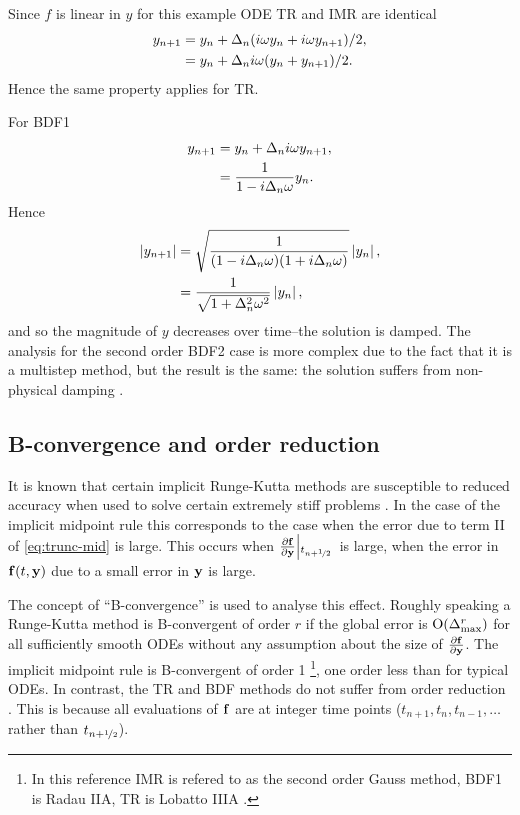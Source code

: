Since $f$ is linear in $y$ for this example ODE TR and IMR are identical
\begin{equation}
  \begin{aligned}
    y_{n+1} &= y_n + \Delta_{n}(i\omega y_n + i\omega y_{n+1})/2, \\
    &= y_n + \Delta_{n} i \omega (y_n + y_{n+1})/2.
  \end{aligned} 
\end{equation}
Hence the same property applies for TR.

For BDF1
\begin{equation}
  \begin{aligned}
    y_{n+1} &= y_n + \Delta_{n} i \omega y_{n+1}, \\
    &= \frac{1}{1 - i \Delta_{n} \omega} y_n.
  \end{aligned}
\end{equation}
Hence
\begin{equation}
  \begin{aligned}
    \left|{y_{n+1}} \right| &= \sqrt{ \frac{1}{(1 - i \Delta_{n} \omega)(1 + i \Delta_{n} \omega)}} \left|{y_n} \right|, \\
    &= \frac{1}{\sqrt{1 + \Delta_{n}^2 \omega^2}} \left|{y_n} \right|, \\
  \end{aligned}
\end{equation}
and so the magnitude of $y$ decreases over time--the solution is damped.
The analysis for the second order BDF2 case is more complex due to the fact that it is a multistep method, but the result is the same: the solution suffers from non-physical damping \cite[265]{GreshoSani}.


\subsection{B-convergence and order reduction}
\label{sec:order-reduction}

It is known that certain implicit Runge-Kutta methods are susceptible to reduced accuracy when used to solve certain extremely stiff problems \cite[156]{Atkinson1994}\cite[225]{HairerWanner}.
In the case of the implicit midpoint rule this corresponds to the case when the error due to term II of \eqref{eq:trunc-mid} is large. This occurs when $\frac{\partial {\mathbf{f}}}{\partial \mathbf{y}}{\left|_{t_{n+\nicefrac{1}{2}}{}}\right.}$ is large, \ie when the error in ${\mathbf{f}{\left( t, \mathbf{y} \right)}}$ due to a small error in $\mathbf{y}$ is large.

The concept of ``B-convergence'' is used to analyse this effect.
Roughly speaking a Runge-Kutta method is B-convergent of order $r$ if the global error is  $\text{O}(\Delta_{\text{max}}^r)$ for all sufficiently smooth ODEs without any assumption about the size of $\frac{\partial {\mathbf{f}}}{\partial \mathbf{y}}$.
The implicit midpoint rule is B-convergent of order 1 \cite[231]{HairerWanner}\footnote{In this reference IMR is refered to as the second order Gauss method, BDF1 is Radau IIA, TR is Lobatto IIIA \cite[72-76]{HairerWanner}.}, one order less than for typical ODEs.
In contrast, the TR and BDF methods do not suffer from order reduction \cite[159]{Atkinson1994}.
This is because all evaluations of ${\mathbf{f}}$ are at integer time points (\ie $t_{n+1}, t_{n}, t_{n-1}, \ldots$ rather than $t_{n+\nicefrac{1}{2}}$).

